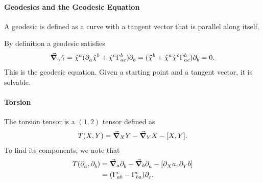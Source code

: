 \paragraph{Geodesics and the Geodesic Equation}
A geodesic is defined as a curve with a tangent vector that is parallel along itself.

By definition a geodesic satisfies
\begin{align*}
\dcov{\dot{\gamma}}{\dot{\gamma}} = \dot{\chi}^{a}(\del{a}{\dot{\chi}^{b}} + \dot{\chi}^{c}\chris{b}{a}{c})\del{b}{} = (\ddot{\chi}^{b} + \dot{\chi}^{a}\dot{\chi}^{c}\chris{b}{a}{c})\del{b}{} = 0.
\end{align*}
This is the geodesic equation. Given a starting point and a tangent vector, it is solvable.

\paragraph{Torsion}
The torsion tensor is a $(1, 2)$ tensor defined as
\begin{align*}
T(X, Y) = \dcov{X}{Y} - \dcov{Y}{X} - \comm{X}{Y}.
\end{align*}
To find its components, we note that
\begin{align*}
T(\del{a}{}, \del{b}{}) &= \dcov{a}{\del{b}{}} - \dcov{b}{\del{a}{}} - \comm{\del{X}{a}}{\del{Y}{b}} \\
&= (\chris{c}{a}{b} - \chris{c}{b}{a})\del{c}{}.
\end{align*}

